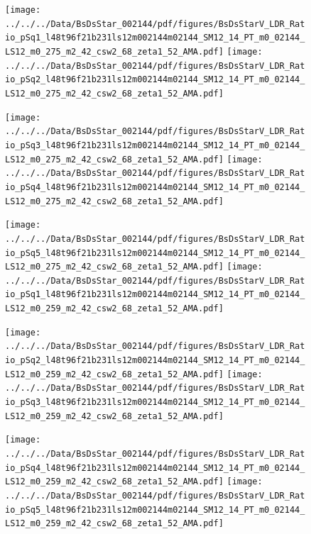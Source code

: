 \documentclass[a4paper,10pt]{article}
\begin{document}
\begin{figure}[p]
 \texttt{[image: ../../../Data/BsDsStar\_002144/pdf/figures/BsDsStarV\_LDR\_Ratio\_pSq1\_l48t96f21b231ls12m002144m02144\_SM12\_14\_PT\_m0\_02144\_LS12\_m0\_275\_m2\_42\_csw2\_68\_zeta1\_52\_AMA.pdf]} 
 \texttt{[image: ../../../Data/BsDsStar\_002144/pdf/figures/BsDsStarV\_LDR\_Ratio\_pSq2\_l48t96f21b231ls12m002144m02144\_SM12\_14\_PT\_m0\_02144\_LS12\_m0\_275\_m2\_42\_csw2\_68\_zeta1\_52\_AMA.pdf]} 
 \end{figure}
\begin{figure}[p]
 \texttt{[image: ../../../Data/BsDsStar\_002144/pdf/figures/BsDsStarV\_LDR\_Ratio\_pSq3\_l48t96f21b231ls12m002144m02144\_SM12\_14\_PT\_m0\_02144\_LS12\_m0\_275\_m2\_42\_csw2\_68\_zeta1\_52\_AMA.pdf]} 
 \texttt{[image: ../../../Data/BsDsStar\_002144/pdf/figures/BsDsStarV\_LDR\_Ratio\_pSq4\_l48t96f21b231ls12m002144m02144\_SM12\_14\_PT\_m0\_02144\_LS12\_m0\_275\_m2\_42\_csw2\_68\_zeta1\_52\_AMA.pdf]} 
 \end{figure}
\begin{figure}[p]
 \texttt{[image: ../../../Data/BsDsStar\_002144/pdf/figures/BsDsStarV\_LDR\_Ratio\_pSq5\_l48t96f21b231ls12m002144m02144\_SM12\_14\_PT\_m0\_02144\_LS12\_m0\_275\_m2\_42\_csw2\_68\_zeta1\_52\_AMA.pdf]} 
 \texttt{[image: ../../../Data/BsDsStar\_002144/pdf/figures/BsDsStarV\_LDR\_Ratio\_pSq1\_l48t96f21b231ls12m002144m02144\_SM12\_14\_PT\_m0\_02144\_LS12\_m0\_259\_m2\_42\_csw2\_68\_zeta1\_52\_AMA.pdf]} 
 \end{figure}
\clearpage
\begin{figure}[p]
 \texttt{[image: ../../../Data/BsDsStar\_002144/pdf/figures/BsDsStarV\_LDR\_Ratio\_pSq2\_l48t96f21b231ls12m002144m02144\_SM12\_14\_PT\_m0\_02144\_LS12\_m0\_259\_m2\_42\_csw2\_68\_zeta1\_52\_AMA.pdf]} 
 \texttt{[image: ../../../Data/BsDsStar\_002144/pdf/figures/BsDsStarV\_LDR\_Ratio\_pSq3\_l48t96f21b231ls12m002144m02144\_SM12\_14\_PT\_m0\_02144\_LS12\_m0\_259\_m2\_42\_csw2\_68\_zeta1\_52\_AMA.pdf]} 
 \end{figure}
\begin{figure}[p]
 \texttt{[image: ../../../Data/BsDsStar\_002144/pdf/figures/BsDsStarV\_LDR\_Ratio\_pSq4\_l48t96f21b231ls12m002144m02144\_SM12\_14\_PT\_m0\_02144\_LS12\_m0\_259\_m2\_42\_csw2\_68\_zeta1\_52\_AMA.pdf]} 
 \texttt{[image: ../../../Data/BsDsStar\_002144/pdf/figures/BsDsStarV\_LDR\_Ratio\_pSq5\_l48t96f21b231ls12m002144m02144\_SM12\_14\_PT\_m0\_02144\_LS12\_m0\_259\_m2\_42\_csw2\_68\_zeta1\_52\_AMA.pdf]} 
 \end{figure}
\clearpage
\end{document}
